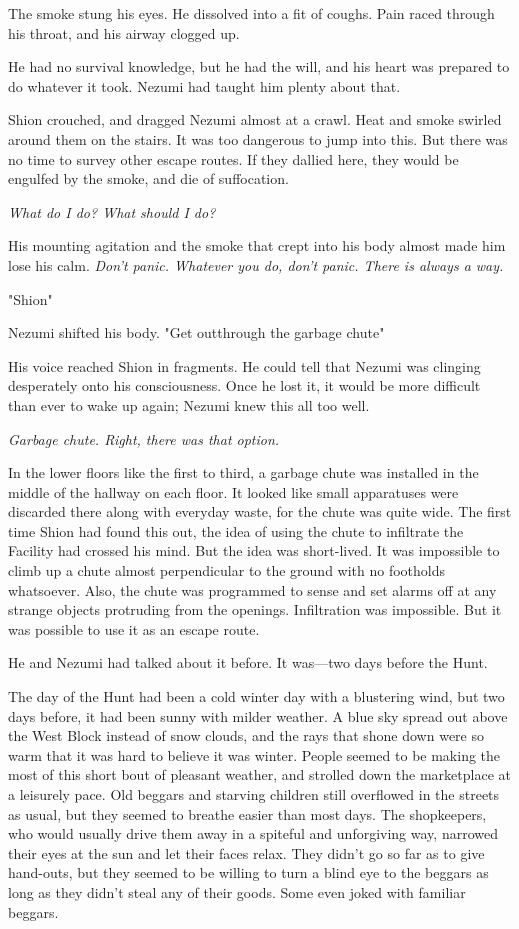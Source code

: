 The smoke stung his eyes. He dissolved into a fit of coughs. Pain raced
through his throat, and his airway clogged up.

He had no survival knowledge, but he had the will, and his heart was
prepared to do whatever it took. Nezumi had taught him plenty about
that.

Shion crouched, and dragged Nezumi almost at a crawl. Heat and smoke
swirled around them on the stairs. It was too dangerous to jump into
this. But there was no time to survey other escape routes. If they
dallied here, they would be engulfed by the smoke, and die of
suffocation.

\emph{What do I do? What should I do?}

His mounting agitation and the smoke that crept into his body almost
made him lose his calm. \emph{Don't panic. Whatever you do, don't panic. There
is always a way.}

"Shion\el "

Nezumi shifted his body. "Get out\el through the garbage chute\el "

His voice reached Shion in fragments. He could tell that Nezumi was
clinging desperately onto his consciousness. Once he lost it, it would
be more difficult than ever to wake up again; Nezumi knew this all too
well.

\emph{Garbage chute. Right, there was that option.}

In the lower floors like the first to third, a garbage chute was
installed in the middle of the hallway on each floor. It looked like
small apparatuses were discarded there along with everyday waste, for
the chute was quite wide. The first time Shion had found this out, the
idea of using the chute to infiltrate the Facility had crossed his mind.
But the idea was short-lived. It was impossible to climb up a chute
almost perpendicular to the ground with no footholds whatsoever. Also,
the chute was programmed to sense and set alarms off at any strange
objects protruding from the openings. Infiltration was impossible. But
it was possible to use it as an escape route.

He and Nezumi had talked about it before. It was---two days before the
Hunt.

The day of the Hunt had been a cold winter day with a blustering wind,
but two days before, it had been sunny with milder weather. A blue sky
spread out above the West Block instead of snow clouds, and the rays
that shone down were so warm that it was hard to believe it was winter.
People seemed to be making the most of this short bout of pleasant
weather, and strolled down the marketplace at a leisurely pace. Old
beggars and starving children still overflowed in the streets as usual,
but they seemed to breathe easier than most days. The shopkeepers, who
would usually drive them away in a spiteful and unforgiving way,
narrowed their eyes at the sun and let their faces relax. They didn't go
so far as to give hand-outs, but they seemed to be willing to turn a
blind eye to the beggars as long as they didn't steal any of their
goods. Some even joked with familiar beggars.

